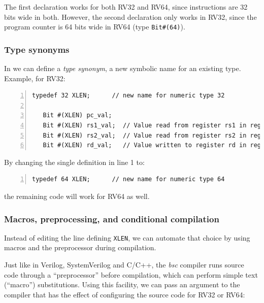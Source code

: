 The first declaration works for both RV32 and RV64, since instructions
are 32 bits wide in both.  However, the second declaration only works
in RV32, since the program counter is 64 bits wide in RV64 (type
\verb|Bit#(64)|).


\subsubsection{Type synonyms}


In {\BSV} we can define a \emph{type synonym}, a new symbolic name for
an existing type. Example, for RV32:

{\footnotesize
\begin{Verbatim}[frame=single, numbers=left]
   typedef 32 XLEN;      // new name for numeric type 32

   Bit #(XLEN) pc_val;
   Bit #(XLEN) rs1_val;  // Value read from register rs1 in register file
   Bit #(XLEN) rs2_val;  // Value read from register rs2 in register file
   Bit #(XLEN) rd_val;   // Value written to register rd in register file
\end{Verbatim}
}

By changing the single definition in line 1 to:

{\footnotesize
\begin{Verbatim}[frame=single, numbers=left]
   typedef 64 XLEN;      // new name for numeric type 64
\end{Verbatim}
}

the remaining code will work for RV64 as well.


\subsubsection{Macros, preprocessing, and conditional compilation}

\label{BSV_Conditional_compilation}


Instead of editing the line defining {\tt XLEN}, we can automate that
choice by using macros and the preprocessor during compilation.

Just like in Verilog, SystemVerilog and C/C++, the \emph{bsc} compiler
runs {\BSV} source code through a ``preprocessor'' before compilation,
which can perform simple text (``macro'') substitutions.  Using this
facility, we can pass an argument to the compiler that has the effect
of configuring the source code for RV32 or RV64:

